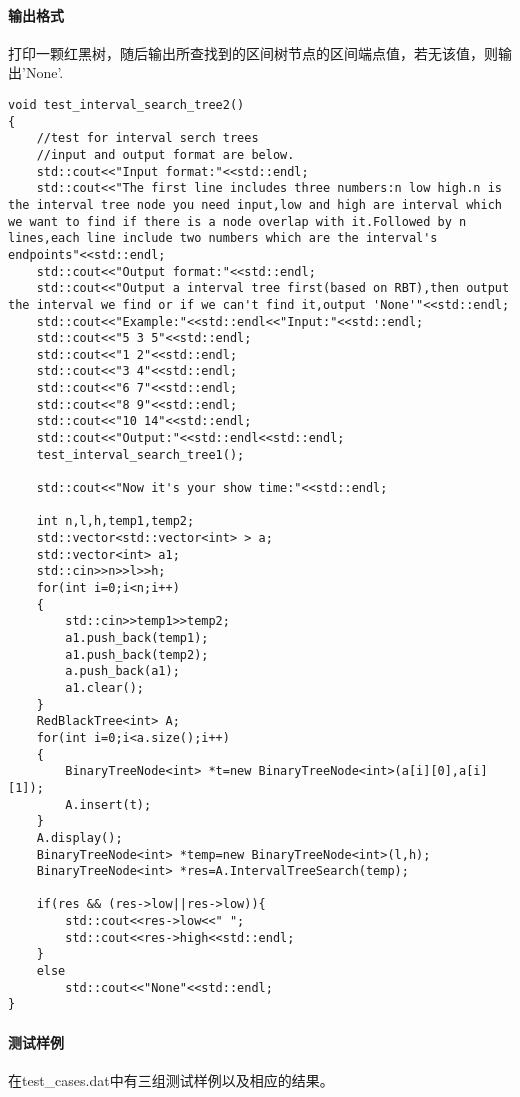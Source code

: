 \documentclass{article}
\begin{document}
\paragraph{输出格式}
打印一颗红黑树，随后输出所查找到的区间树节点的区间端点值，若无该值，则输出'None'.
\begin{lstlisting}
void test_interval_search_tree2()
{
    //test for interval serch trees
    //input and output format are below.
    std::cout<<"Input format:"<<std::endl;
    std::cout<<"The first line includes three numbers:n low high.n is the interval tree node you need input,low and high are interval which we want to find if there is a node overlap with it.Followed by n lines,each line include two numbers which are the interval's endpoints"<<std::endl;
    std::cout<<"Output format:"<<std::endl;
    std::cout<<"Output a interval tree first(based on RBT),then output the interval we find or if we can't find it,output 'None'"<<std::endl;
    std::cout<<"Example:"<<std::endl<<"Input:"<<std::endl;
    std::cout<<"5 3 5"<<std::endl;
    std::cout<<"1 2"<<std::endl;
    std::cout<<"3 4"<<std::endl;
    std::cout<<"6 7"<<std::endl;
    std::cout<<"8 9"<<std::endl;
    std::cout<<"10 14"<<std::endl;
    std::cout<<"Output:"<<std::endl<<std::endl;
    test_interval_search_tree1();
    
    std::cout<<"Now it's your show time:"<<std::endl;
    
    int n,l,h,temp1,temp2;
    std::vector<std::vector<int> > a;
    std::vector<int> a1;
    std::cin>>n>>l>>h;
    for(int i=0;i<n;i++)
    {
        std::cin>>temp1>>temp2;
        a1.push_back(temp1);
        a1.push_back(temp2);
        a.push_back(a1);
        a1.clear();
    }
    RedBlackTree<int> A;
    for(int i=0;i<a.size();i++)
    {
        BinaryTreeNode<int> *t=new BinaryTreeNode<int>(a[i][0],a[i][1]);
        A.insert(t);
    }
    A.display();
    BinaryTreeNode<int> *temp=new BinaryTreeNode<int>(l,h);
    BinaryTreeNode<int> *res=A.IntervalTreeSearch(temp);

    if(res && (res->low||res->low)){
        std::cout<<res->low<<" ";
        std::cout<<res->high<<std::endl;
    }
    else
        std::cout<<"None"<<std::endl;
}
\end{lstlisting}

\paragraph{测试样例}
在test\_cases.dat中有三组测试样例以及相应的结果。
\end{document}
